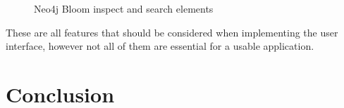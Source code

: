 \begin{figure}[H]%
    \centering
    \qquad
    \caption{Neo4j Bloom inspect and search elements}
\end{figure}
These are all features that should be considered when implementing the user interface, however not all of them are essential for a usable application.
\section{Conclusion}